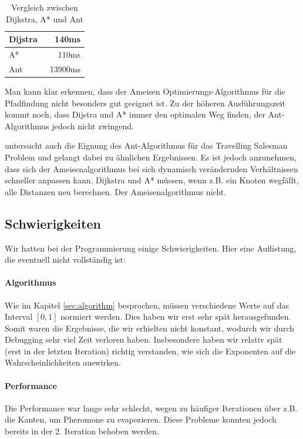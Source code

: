 \begin{table}[h]
\begin{tabular}{ | l | r | }
\hline
Dijstra & ~140ms \\
\hline
A* & ~110ms \\
\hline
Ant & ~13900ms \\
\hline
\end{tabular}
\caption{Vergleich zwischen Dijkstra, A* und Ant}
\end{table}

Man kann klar erkennen, dass der Ameisen Optimierungs-Algorithmus für die Pfadfindung nicht besonders gut geeignet ist. Zu der höheren Ausführungszeit kommt noch, dass Dijstra und A* immer den optimalen Weg finden, der Ant-Algorithmus jedoch nicht zwingend.

\citeauthor*{leo-perf} untersucht auch die Eignung des Ant-Algorithmus für das Travelling Salesman Problem und gelangt dabei zu ähnlichen Ergebnissen. Es ist jedoch anzunehmen, dass sich der Ameisenalgorithmus bei sich dynamisch verändernden Verhältnissen schneller anpassen kann. Dijkstra und A* müssen, wenn z.B. ein Knoten wegfällt, alle Distanzen neu berechnen. Der Ameisenalgorithmus nicht.

\subsection{Schwierigkeiten}

Wir hatten bei der Programmierung einige Schwierigkeiten. Hier eine Auflistung, die eventuell nicht vollständig ist:

\paragraph*{Algorithmus}

Wie im Kapitel \ref{sec:algorithm} besprochen, müssen verschiedene Werte auf das Interval $[0,1]$ normiert werden. Dies haben wir erst sehr spät herausgefunden. Somit waren die Ergebnisse, die wir erhielten nicht konstant, wodurch wir durch Debugging sehr viel Zeit verloren haben. Insbesondere haben wir relativ spät (erst in der letzten Iteration) richtig verstanden, wie sich die Exponenten auf die Wahrscheinlichkeiten auswirken.

\paragraph*{Performance}

Die Performance war lange sehr schlecht, wegen zu häufiger Iterationen über z.B. die Kanten, um Pheromone zu evaporieren. Diese Probleme konnten jedoch bereits in der 2. Iteration behoben werden.

